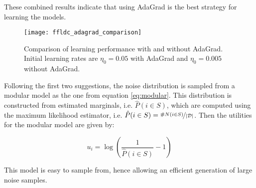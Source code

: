 These combined results indicate that using AdaGrad is the best strategy for learning the models.

\begin{figure}
  \centering
  \texttt{[image: ffldc\_adagrad\_comparison]}
  \caption{Comparison of learning performance with and without AdaGrad. Initial learning rates are $\eta_0 = 0.05$ with AdaGrad and $\eta_0 = 0.005$ without AdaGrad.}
  \label{fig:comparison_adagrad_ffldc_toy}
\end{figure}

Following the first two suggestions, the noise distribution is sampled from a modular model as the one from equation \ref{eq:modular}. This distribution is constructed from estimated marginals, i.e. $\hat{P}(i \in S)$, which are computed using the maximum likelihood estimator, i.e. $\hat{P}(i \in S) = \nicefrac{\#N(i \in S)}{|\mathcal{D}|}$. Then the utilities for the modular model are given by:

\begin{equation}
u_{i} = \log{\left(\frac{1}{\hat{P}(i \in S)} - 1\right)}
\end{equation}

This model is easy to sample from, hence allowing an efficient generation of large noise samples.